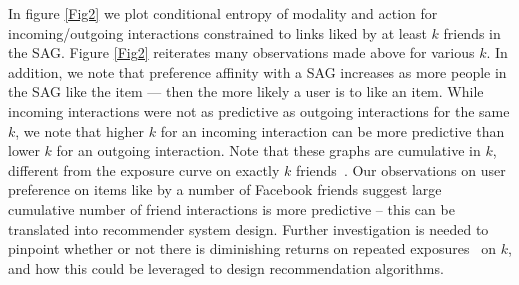 In figure \ref{Fig2} we plot conditional entropy of modality and
action for incoming/outgoing interactions constrained to links
liked by at least $k$ friends in the SAG.  Figure \ref{Fig2} reiterates
many observations made above for various $k$.  In addition, we note that
preference affinity with a SAG increases as more people in the SAG
like the item --- then the more likely a user is to like an item.
While incoming interactions were not as predictive as outgoing
interactions for the same $k$, we note that higher $k$ for an incoming
interaction can be more predictive than lower $k$ for an outgoing
interaction.  Note that these graphs are cumulative in $k$, different from the 
exposure curve on exactly $k$ friends~\cite{Romero2011hashtag}. 
Our observations on user preference on items like by a number of Facebook friends 
suggest large cumulative number of friend interactions is more predictive 
-- this can be translated into recommender system design. 
Further investigation is needed to pinpoint whether or not there is 
diminishing returns on repeated exposures~\cite{ver2011stops,Romero2011hashtag} on $k$, 
and how this could be leveraged to design recommendation algorithms.



